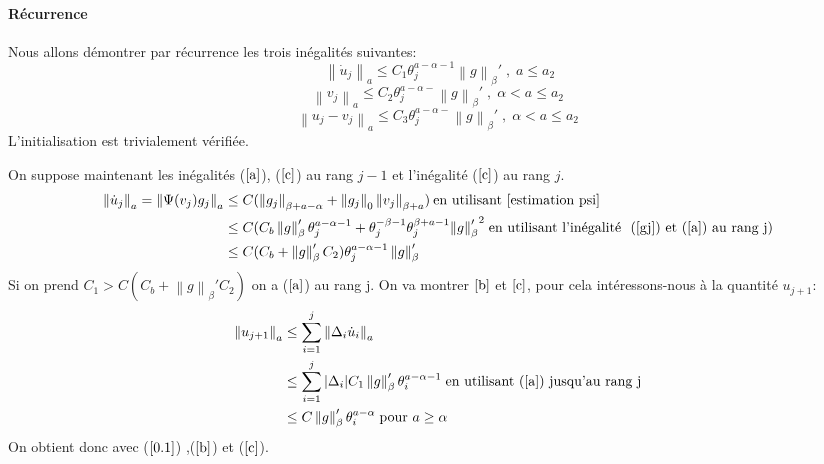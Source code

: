 \documentclass[11pt,a4paper]{article}
\begin{document}
\paragraph{Récurrence}
Nous allons démontrer par récurrence les trois inégalités suivantes:
\begin{equation} \label{a}
\; \left\|\dot{u}_j \right\|_a \leq C_1 \theta^{a-\alpha-1}_j \left\|g \right\|_\beta' \; , \; a \leq a_2 
\end{equation} 
\begin{equation} \label{b}
\left\| v_j \right\|_a \leq C_2 \theta^{a-\alpha-}_j \left\|g \right\|_\beta' \; , \; \alpha < a \leq a_2  
\end{equation}
\begin{equation}\label{c} 
\left\|u_j - v_j \right\|_a \leq C_3 \theta^{a-\alpha-}_j \left\|g \right\|_\beta' \; , \; \alpha < a \leq a_2  
\end{equation}
L'initialisation est trivialement vérifiée.

On suppose maintenant les inégalités ($\ref{a}$), ($\ref{c}$) au rang $j-1$ et l'inégalité ($\ref{c}$) au rang $j$.
\[
\begin{aligned}
\left\|\dot{u}_j \right\|_a = \left\|\Psi(v_j)g_j \right\|_a &\leq C (\left\|g_j \right\|_{\beta + a - \alpha} + \left\|g_j \right\|_0 \left\|v_j \right\|_{\beta + a}) \: \text{en utilisant}  \ \ref{estimation psi} \\
&\leq C( C_b \left\|g \right\|_\beta' \theta^{a-\alpha-1}_j + \theta^{-\beta-1}_j \theta^{\beta+a-1}_j {\left\|g \right\|_\beta'}^2 \; \text{en utilisant l'inégalité } \ (\ref{gj}) \text{ et} \ (\ref{a}) \ \text{au rang j}) \\
&\leq C (C_b + \left\|g \right\|_\beta' C_2) \theta^{a-\alpha-1}_j \left\|g \right\|_\beta'
\end{aligned}
\]
Si on prend $C_1 > C (C_b + \left\|g \right\|_\beta' C_2)$ on a ($\ref{a}$) au rang j.
On va montrer $\ref{b}$ et $\ref{c}$, pour cela intéressons-nous à la quantité $u_{j+1}$:
\[
\begin{aligned}
\left\|u_{j+1} \right\|_a &\leq \sum^j_{i=1} \left\|\Delta_i \dot{u}_i  \right\|_a \\ 
&\leq \sum^j_{i=1} |\Delta_i| C_1 \left\|g \right\|_\beta' \theta^{a-\alpha-1}_i \; \text{en utilisant} \ (\ref{a}) \ \text{jusqu'au rang j} \\
&\leq C \left\|g \right\|_\beta' \theta^{a-\alpha}_i \; \text{pour } a \geq \alpha
\end{aligned}
\]
On obtient donc avec ($\ref{0.1}$) ,($\ref{b}$) et ($\ref{c}$).
\end{document}
